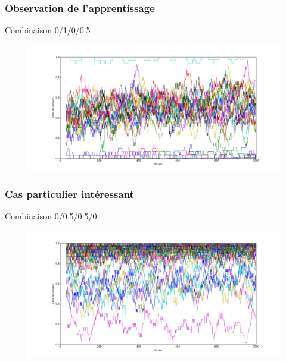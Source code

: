 \documentclass{beamer}
\begin{document}
\begin{frame}
  \frametitle{Observation de l'apprentissage}

  \center Combinaison 0/1/0/0.5

  \begin{figure}
    \includegraphics[scale=0.265, trim=0 2cm 0 0]{plot/eleve2}
  \end{figure}
\end{frame}

\begin{frame}
  \frametitle{Cas particulier intéressant}

  \center Combinaison 0/0.5/0.5/0

  \begin{figure}
    \includegraphics[scale=0.265, trim=0 2cm 0 0]{plot/fake}
  \end{figure}
\end{frame}
\end{document}
